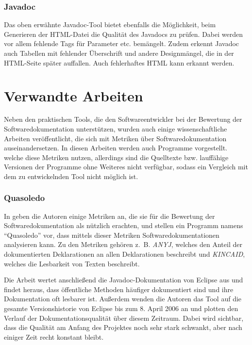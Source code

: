 \subsubsection{Javadoc}
Das oben erwähnte Javadoc-Tool bietet ebenfalls die Möglichkeit, beim Generieren der HTML-Datei die Qualität des Javadocs zu prüfen. Dabei werden vor allem fehlende Tags für Parameter etc. bemängelt. Zudem erkennt Javadoc auch Tabellen mit fehlender Überschrift und andere Designmängel, die in der HTML-Seite später auffallen. Auch fehlerhaftes HTML kann erkannt werden.

\section{Verwandte Arbeiten}

Neben den praktischen Tools, die den Softwareentwickler bei der Bewertung der Softwaredokumentation unterstützen, wurden auch einige wissenschaftliche Arbeiten veröffentlicht, die sich mit Metriken über Softwaredokumentation auseinandersetzen. In diesen Arbeiten werden auch Programme vorgestellt. welche diese Metriken nutzen, allerdings sind die Quelltexte bzw.  lauffähige Versionen der Programme ohne Weiteres nicht verfügbar, sodass ein Vergleich mit dem zu entwickelnden Tool nicht möglich ist. 


\subsubsection{Quasoledo}\label{chapter:Quasoledo}
In \cite[S. 4-10]{HowDocumentationEvolvesoverTime} geben die Autoren einige Metriken an, die sie für die Bewertung der Softwaredokumentation als nützlich erachten, und stellen ein Programm namens \enquote{Quasoledo} vor, dass mittels dieser Metriken Softwaredokumentationen analysieren kann. Zu den Metriken gehören z.~B.  \textit{ANYJ},  welches den Anteil der dokumentierten Deklarationen an allen Deklarationen beschreibt und \textit{KINCAID}, welches die Lesbarkeit von Texten beschreibt.

Die Arbeit wertet anschließend die Javadoc-Dokumentation von Eclipse aus und findet heraus, dass öffentliche Methoden häufiger dokumentiert sind und ihre Dokumentation oft lesbarer ist. Außerdem wenden die Autoren das Tool auf die gesamte Versionshistorie von Eclipse bis zum 8. April 2006 an und plotten den Verlauf der Dokumentationsqualität über diesem Zeitraum. Dabei wird sichtbar, dass die Qualität am Anfang des Projektes noch sehr stark schwankt, aber nach einiger Zeit recht konstant bleibt. 
